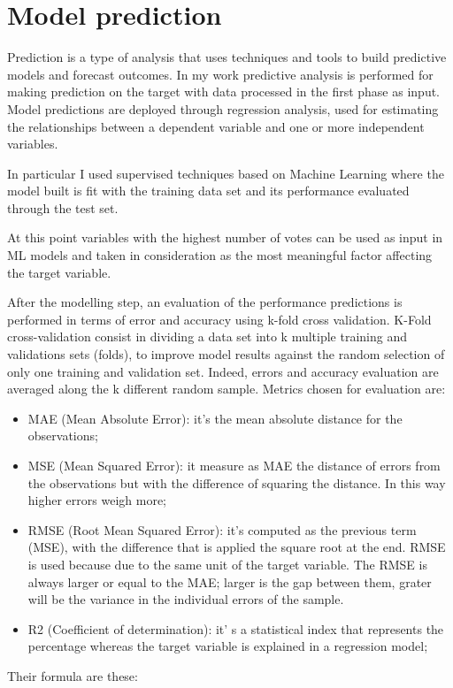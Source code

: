 \section{Model prediction}
Prediction is a type of analysis that uses techniques and tools to build predictive models and forecast outcomes. 
In my work predictive analysis is performed for making prediction on the target with data processed in the first phase as input.\newline
Model predictions are deployed through regression analysis, used for estimating the relationships between a dependent variable and one or more independent variables.\par
In particular I used supervised techniques based on Machine Learning where the model built is fit with the training data set and its performance evaluated through the test set. 
\par
At this point variables with the highest number of votes can be used as input in ML models and taken in consideration as the most meaningful factor affecting the target variable.
\par
After the modelling step, an evaluation of the performance predictions is performed in terms of error and accuracy using k-fold cross validation.\newline
K-Fold cross-validation consist in dividing a data set into k multiple training and validations sets (folds), to improve model results against the random selection of only one training and validation set. Indeed, errors and accuracy evaluation are averaged along the k different random sample.
Metrics chosen for evaluation are:
\begin{itemize}
    \item MAE (Mean Absolute Error): it's the mean absolute distance for the observations;
    \item MSE (Mean Squared Error): it measure as MAE the distance of errors from the observations but with the difference of squaring the distance. In this way higher errors weigh more;
    \item RMSE (Root Mean Squared Error): it's computed as the previous term (MSE), with the difference that is applied the square root at the end. RMSE is used because due to the same unit of the target variable.
    The RMSE is always larger or equal to the MAE; larger is the gap between them, grater will be the variance in the individual errors of the sample.
    \item R2 (Coefficient of determination): it' s a statistical index that represents the percentage whereas the target variable is explained in a regression model;
\end{itemize} 
Their formula are these:
